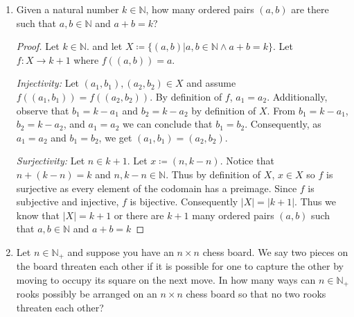 \documentclass{article}
\newcommand{\defeq}{\coloneqq}
\newcommand{\naturals}{\mathbb{N}}
\newcommand{\ceil}[1]{\lceil {#1} \rceil}
\newenvironment{case}[1][Case]
    {\par\textit{#1:}\hfill\break}
    {}
\begin{document}
\begin{enumerate}
\begin{proof}
\begin{case}[Surjectivity]
\[            \]
            Observe that $f(s)=b$ as by definition of s, $f(s)(i)=s(i)=b(i)$ for all $i$ such that $0 \leq i < \ceil{\frac{k}{2}}$.\\
            Additionally, observe that $s:k \to X$ such that $(\forall i \in k)(s(i) = s(k - 1 - i))$. Consequently, by definition of $A$, $s \in A$ so $f$ is surjective as every element of the codomain has a preimage.
        \end{case}
        Since $f$ is subjective and injective, $f$ is bijective. Consequently $|A|=|B|$.
        We know that $|B|=|X|^{\ceil{\frac{k}{2}}}$ by theorem 6.10 because the elements of $B$ are strings of length $k$ over the alphabet $|X|$. Since $|X|=26$, $|B|=26^{\ceil{\frac{k}{2}}}$ and since $|A|=|B|$, $|A|=26^{\ceil{\frac{k}{2}}}$. Thus there are $26^{\ceil{\frac{k}{2}}}$ possible palindromic words of length $k \in \naturals$ in the English Language.
    \end{proof}
\pagebreak
    \item Given a natural number $k \in \naturals$, how many ordered pairs $(a, b)$ are there such that $a, b \in \naturals$ and $a + b = k$?
    \begin{proof}
        Let $k \in \naturals$. and let $X \defeq \{(a,b)|a,b \in \naturals \land a+b=k\}$. Let $f:X \to k+1$ where $f((a,b))=a$. 
        \begin{case}[Injectivity]
           Let $(a_1,b_1),(a_2,b_2) \in X$ and assume $f((a_1,b_1))=f((a_2,b_2))$. By definition of $f$, $a_1=a_2$. Additionally, observe that $b_1=k-a_1$ and $b_2=k-a_2$ by definition of $X$. From $b_1=k-a_1$, $b_2=k-a_2$, and $a_1=a_2$ we can conclude that $b_1=b_2$. Consequently, as $a_1=a_2$ and $b_1=b_2$, we get $(a_1,b_1)=(a_2,b_2)$. 
        \end{case}
        \begin{case}[Surjectivity]
            Let $n \in k+1$. Let $x\defeq (n,k-n)$. Notice that $n+(k-n)=k$ and $n,k-n \in \naturals$. Thus by definition of $X$, $x \in X$ so $f$ is surjective as every element of the codomain has a preimage.
        \end{case}
        Since $f$ is subjective and injective, $f$ is bijective. Consequently $|X|=|k+1|$. Thus we know that $|X|=k+1$ or there are $k+1$ many ordered pairs $(a, b)$ such that $a, b \in \naturals$ and $a + b = k$ 
    \end{proof}
    \item Let $n \in \naturals_+$ and suppose you have an $n \times n$ chess board.
    We say two pieces on the board threaten each other if it is possible for one to capture the other by moving to occupy its square on the next move. In how many ways can $n \in \naturals_+$ rooks possibly be arranged on an $n \times n$ chess board so that no two rooks threaten each other?\\

\end{enumerate}
\end{document}
